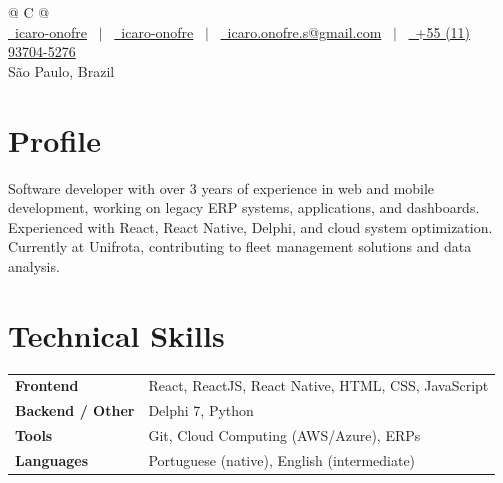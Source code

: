 \documentclass[a4paper,11pt]{article}
\begin{document}
\pagestyle{empty}

\begin{tabularx}{\linewidth}{@{} C @{}}
\fontsize{32}{38} \\[6pt]
\small
\href{https://github.com/icaro-onofre}{\raisebox{-0.05\height}\faGithub\ icaro-onofre} \
$|$ \
\href{https://linkedin.com/in/icaro-onofre}{\raisebox{-0.05\height}\faLinkedin\ icaro-onofre} \
$|$ \
\href{mailto:icaro.onofre.s@gmail.com}{\raisebox{-0.05\height}\faEnvelope\ icaro.onofre.s@gmail.com} \
$|$ \
\href{tel:+5511937045276}{\raisebox{-0.05\height}\faMobile\ +55 (11) 93704-5276} \\[4pt]
\small\color{medgray} São Paulo, Brazil
\end{tabularx}

\vspace{4pt}

\section{Profile}

Software developer with over 3 years of experience in web and mobile development, working on legacy ERP systems, applications, and dashboards. Experienced with React, React Native, Delphi, and cloud system optimization. Currently at Unifrota, contributing to fleet management solutions and data analysis.

\section{Technical Skills}

\begin{tabularx}{\linewidth}{@{}l X@{}}
\textbf{Frontend} & React, ReactJS, React Native, HTML, CSS, JavaScript \\[3pt]
\textbf{Backend / Other} & Delphi 7, Python \\[3pt]
\textbf{Tools} & Git, Cloud Computing (AWS/Azure), ERPs \\[3pt]
\textbf{Languages} & Portuguese (native), English (intermediate) \\
\end{tabularx}
\end{document}
